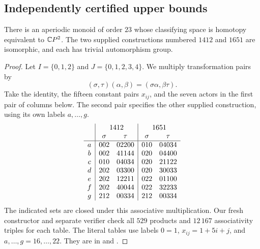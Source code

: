 \subsection{Independently certified upper bounds}

\begin{theorem}[Proved]\label{A:monoid-upper23}
There is an aperiodic monoid of order $23$ whose classifying space is
homotopy equivalent to $\mathbb{C}P^2$. The two supplied constructions numbered
$1412$ and $1651$ are isomorphic, and each has trivial automorphism group.
\end{theorem}
\begin{proof}
Let $I=\{0,1,2\}$ and $J=\{0,1,2,3,4\}$. We multiply transformation
pairs by
\[
 (\sigma,\tau)(\alpha,\beta)=(\sigma\alpha,\beta\tau).
\]
Take the identity, the fifteen constant pairs $x_{ij}$, and the seven
actors in the first pair of columns below. The second pair specifies the
other supplied construction, using its own labels $a,\ldots,g$.
\[
\begin{array}{c|cc|cc}
&\multicolumn{2}{c|}{1412}&\multicolumn{2}{c}{1651}\\
&\sigma&\tau&\sigma&\tau\\\hline
a&002&02200&010&04034\\
b&002&41144&020&04400\\
c&010&04034&020&21122\\
d&202&03300&020&30033\\
e&202&12211&022&01100\\
f&202&40044&022&32233\\
g&212&00334&212&00334
\end{array}
\]
The indicated sets are closed under this associative multiplication. Our
fresh constructor and separate verifier check all $529$ products and
$12\,167$ associativity triples for each table. The literal tables use
labels $0=1$, $x_{ij}=1+5i+j$, and $a,\ldots,g=16,\ldots,22$.
They are in  and
.


\end{proof}
